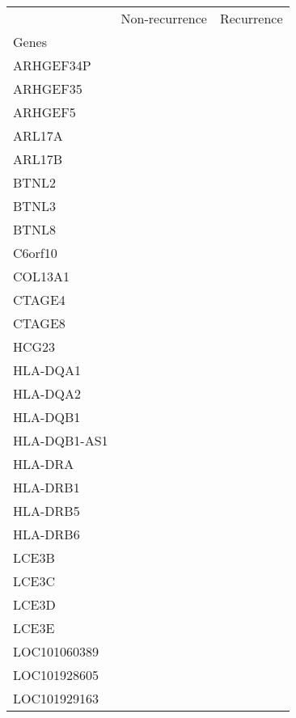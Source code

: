 \begin{tabular}{lcc}
\toprule
{} & Non-recurrence & Recurrence \\
Genes        &                &            \\
\midrule
ARHGEF34P    &                &            \\
ARHGEF35     &                &            \\
ARHGEF5      &                &            \\
ARL17A       &                &            \\
ARL17B       &                &            \\
BTNL2        &                &            \\
BTNL3        &                &            \\
BTNL8        &                &            \\
C6orf10      &                &            \\
COL13A1      &                &            \\
CTAGE4       &                &            \\
CTAGE8       &                &            \\
HCG23        &                &            \\
HLA-DQA1     &                &            \\
HLA-DQA2     &                &            \\
HLA-DQB1     &                &            \\
HLA-DQB1-AS1 &                &            \\
HLA-DRA      &                &            \\
HLA-DRB1     &                &            \\
HLA-DRB5     &                &            \\
HLA-DRB6     &                &            \\
LCE3B        &                &            \\
LCE3C        &                &            \\
LCE3D        &                &            \\
LCE3E        &                &            \\
LOC101060389 &                &            \\
LOC101928605 &                &            \\
LOC101929163 &                &            \\

\end{tabular}
